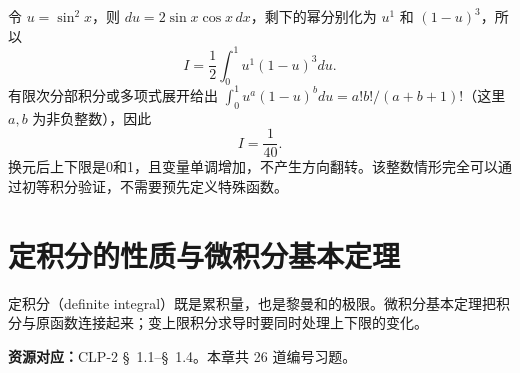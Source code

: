 \documentclass[UTF8,12pt,a4paper,fontset=fandol]{ctexart}
\begin{document}
\begin{solve}\label{ans:c16q24}
令 $u=\sin^2x$，则 $du=2\sin x\cos x\,dx$，剩下的幂分别化为 $u^{1}$ 和 $(1-u)^{3}$，所以
\[
I=\frac12\int_0^1u^{1}(1-u)^{3}du.
\]
有限次分部积分或多项式展开给出 $\int_0^1u^a(1-u)^bdu=a!b!/(a+b+1)!$（这里 $a,b$ 为非负整数），因此
\[
I=\frac{1}{40}.
\]
换元后上下限是0和1，且变量单调增加，不产生方向翻转。该整数情形完全可以通过初等积分验证，不需要预先定义特殊函数。
\end{solve}

\clearpage
\section{定积分的性质与微积分基本定理}\label{sec:ch17}
定积分（definite integral）既是累积量，也是黎曼和的极限。微积分基本定理把积分与原函数连接起来；变上限积分求导时要同时处理上下限的变化。

\textbf{资源对应：}CLP-2 \S~1.1--\S~1.4。本章共 26 道编号习题。
\end{document}
